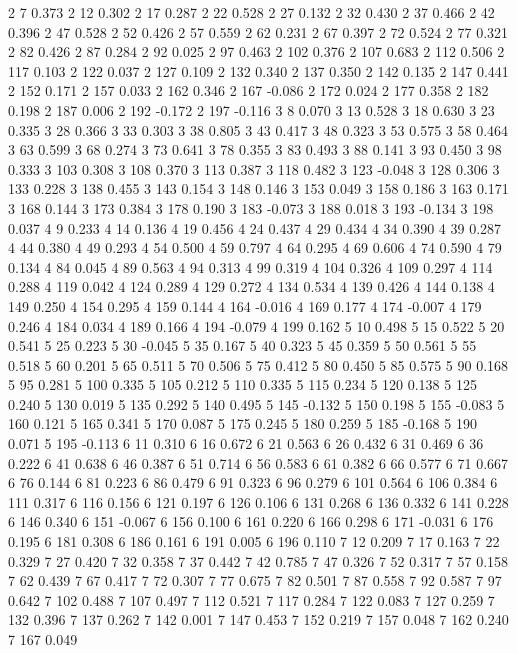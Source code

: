 2 7 0.373
2 12 0.302
2 17 0.287
2 22 0.528
2 27 0.132
2 32 0.430
2 37 0.466
2 42 0.396
2 47 0.528
2 52 0.426
2 57 0.559
2 62 0.231
2 67 0.397
2 72 0.524
2 77 0.321
2 82 0.426
2 87 0.284
2 92 0.025
2 97 0.463
2 102 0.376
2 107 0.683
2 112 0.506
2 117 0.103
2 122 0.037
2 127 0.109
2 132 0.340
2 137 0.350
2 142 0.135
2 147 0.441
2 152 0.171
2 157 0.033
2 162 0.346
2 167 -0.086
2 172 0.024
2 177 0.358
2 182 0.198
2 187 0.006
2 192 -0.172
2 197 -0.116
3 8 0.070
3 13 0.528
3 18 0.630
3 23 0.335
3 28 0.366
3 33 0.303
3 38 0.805
3 43 0.417
3 48 0.323
3 53 0.575
3 58 0.464
3 63 0.599
3 68 0.274
3 73 0.641
3 78 0.355
3 83 0.493
3 88 0.141
3 93 0.450
3 98 0.333
3 103 0.308
3 108 0.370
3 113 0.387
3 118 0.482
3 123 -0.048
3 128 0.306
3 133 0.228
3 138 0.455
3 143 0.154
3 148 0.146
3 153 0.049
3 158 0.186
3 163 0.171
3 168 0.144
3 173 0.384
3 178 0.190
3 183 -0.073
3 188 0.018
3 193 -0.134
3 198 0.037
4 9 0.233
4 14 0.136
4 19 0.456
4 24 0.437
4 29 0.434
4 34 0.390
4 39 0.287
4 44 0.380
4 49 0.293
4 54 0.500
4 59 0.797
4 64 0.295
4 69 0.606
4 74 0.590
4 79 0.134
4 84 0.045
4 89 0.563
4 94 0.313
4 99 0.319
4 104 0.326
4 109 0.297
4 114 0.288
4 119 0.042
4 124 0.289
4 129 0.272
4 134 0.534
4 139 0.426
4 144 0.138
4 149 0.250
4 154 0.295
4 159 0.144
4 164 -0.016
4 169 0.177
4 174 -0.007
4 179 0.246
4 184 0.034
4 189 0.166
4 194 -0.079
4 199 0.162
5 10 0.498
5 15 0.522
5 20 0.541
5 25 0.223
5 30 -0.045
5 35 0.167
5 40 0.323
5 45 0.359
5 50 0.561
5 55 0.518
5 60 0.201
5 65 0.511
5 70 0.506
5 75 0.412
5 80 0.450
5 85 0.575
5 90 0.168
5 95 0.281
5 100 0.335
5 105 0.212
5 110 0.335
5 115 0.234
5 120 0.138
5 125 0.240
5 130 0.019
5 135 0.292
5 140 0.495
5 145 -0.132
5 150 0.198
5 155 -0.083
5 160 0.121
5 165 0.341
5 170 0.087
5 175 0.245
5 180 0.259
5 185 -0.168
5 190 0.071
5 195 -0.113
6 11 0.310
6 16 0.672
6 21 0.563
6 26 0.432
6 31 0.469
6 36 0.222
6 41 0.638
6 46 0.387
6 51 0.714
6 56 0.583
6 61 0.382
6 66 0.577
6 71 0.667
6 76 0.144
6 81 0.223
6 86 0.479
6 91 0.323
6 96 0.279
6 101 0.564
6 106 0.384
6 111 0.317
6 116 0.156
6 121 0.197
6 126 0.106
6 131 0.268
6 136 0.332
6 141 0.228
6 146 0.340
6 151 -0.067
6 156 0.100
6 161 0.220
6 166 0.298
6 171 -0.031
6 176 0.195
6 181 0.308
6 186 0.161
6 191 0.005
6 196 0.110
7 12 0.209
7 17 0.163
7 22 0.329
7 27 0.420
7 32 0.358
7 37 0.442
7 42 0.785
7 47 0.326
7 52 0.317
7 57 0.158
7 62 0.439
7 67 0.417
7 72 0.307
7 77 0.675
7 82 0.501
7 87 0.558
7 92 0.587
7 97 0.642
7 102 0.488
7 107 0.497
7 112 0.521
7 117 0.284
7 122 0.083
7 127 0.259
7 132 0.396
7 137 0.262
7 142 0.001
7 147 0.453
7 152 0.219
7 157 0.048
7 162 0.240
7 167 0.049
